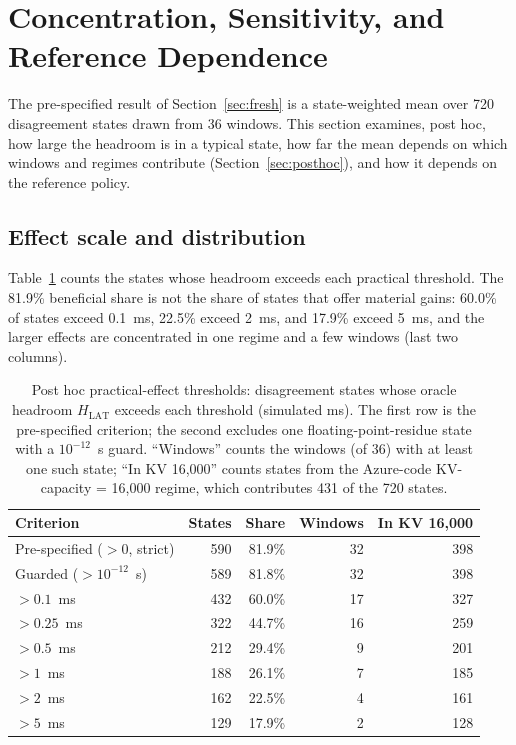 \documentclass[preprint,12pt]{elsarticle}
\begin{document}
\section{Concentration, Sensitivity, and Reference Dependence}
\label{sec:robust}

The pre-specified result of Section~\ref{sec:fresh} is a state-weighted mean
over 720 disagreement states drawn from 36 windows. This section examines, post
hoc, how large the headroom is in a typical state, how far the mean depends on
which windows and regimes contribute (Section~\ref{sec:posthoc}), and how it
depends on the reference policy.

\subsection{Effect scale and distribution}
Table~\ref{tab:thresholds} counts the states whose headroom exceeds each
practical threshold. The 81.9\% beneficial share is not the share of states
that offer material gains: 60.0\% of states exceed 0.1~ms, 22.5\% exceed 2~ms,
and 17.9\% exceed 5~ms, and the larger effects are concentrated in one regime
and a few windows (last two columns).

\begin{table}[!htbp]
\centering
\small
\caption{Post hoc practical-effect thresholds: disagreement states whose oracle
headroom $H_{\mathrm{LAT}}$ exceeds each threshold (simulated ms). The first row is the
pre-specified criterion; the second excludes one floating-point-residue state
with a $10^{-12}$~s guard. ``Windows'' counts the windows (of 36) with at least
one such state; ``In KV 16,000'' counts states from the Azure-code
KV-capacity = 16,000 regime, which contributes 431 of the 720 states.}
\label{tab:thresholds}
\setlength{\tabcolsep}{5pt}
\renewcommand{\arraystretch}{1.15}
\begin{tabular}{@{}lrrrr@{}}
\toprule
Criterion & States & Share & Windows & In KV 16,000 \\
\midrule
Pre-specified ($>0$, strict) & 590 & 81.9\% & 32 & 398 \\
Guarded ($>10^{-12}$~s) & 589 & 81.8\% & 32 & 398 \\
\midrule
$>0.1$~ms & 432 & 60.0\% & 17 & 327 \\
$>0.25$~ms & 322 & 44.7\% & 16 & 259 \\
$>0.5$~ms & 212 & 29.4\% & 9 & 201 \\
$>1$~ms & 188 & 26.1\% & 7 & 185 \\
$>2$~ms & 162 & 22.5\% & 4 & 161 \\
$>5$~ms & 129 & 17.9\% & 2 & 128 \\
\bottomrule
\end{tabular}
\end{table}
\end{document}
